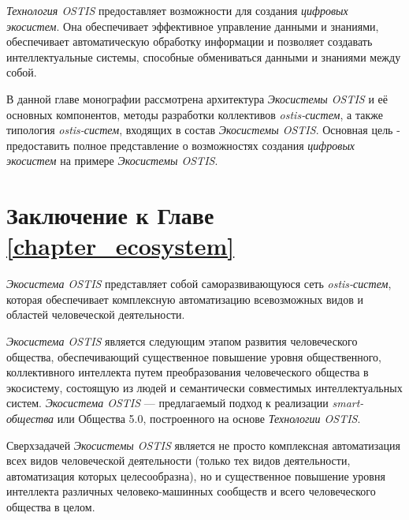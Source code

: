 \textit{Технология OSTIS} предоставляет возможности для создания \textit{цифровых экосистем}. Она обеспечивает эффективное управление данными и знаниями, обеспечивает автоматическую обработку информации и позволяет создавать интеллектуальные системы, способные обмениваться данными и знаниями между собой.

В данной главе монографии рассмотрена архитектура \textit{Экосистемы OSTIS} и её основных компонентов, методы разработки коллективов \textit{ostis-систем}, а также типология \textit{ostis-систем}, входящих в состав \textit{Экосистемы OSTIS}. Основная цель - предоставить полное представление о возможностях создания \textit{цифровых экосистем} на примере \textit{Экосистемы OSTIS}.







%

\section*{Заключение к Главе \ref{chapter_ecosystem}}

\textit{Экосистема OSTIS} представляет собой саморазвивающуюся сеть \textit{ostis-систем}, которая обеспечивает комплексную автоматизацию всевозможных видов и областей человеческой деятельности. 

\textit{Экосистема OSTIS} является следующим этапом развития человеческого общества, обеспечивающий существенное повышение уровня общественного, коллективного интеллекта путем преобразования человеческого общества в экосистему, состоящую из людей и семантически совместимых интеллектуальных систем. 
\textit{Экосистема OSTIS} --- предлагаемый подход к реализации \textit{smart-общества} или Общества 5.0, построенного на основе \textit{Технологии OSTIS}.

Сверхзадачей \textit{Экосистемы OSTIS} является не просто комплексная автоматизация всех видов человеческой деятельности (только тех видов деятельности, автоматизация которых целесообразна), но и существенное повышение уровня интеллекта различных человеко-машинных сообществ и всего человеческого общества в целом.

